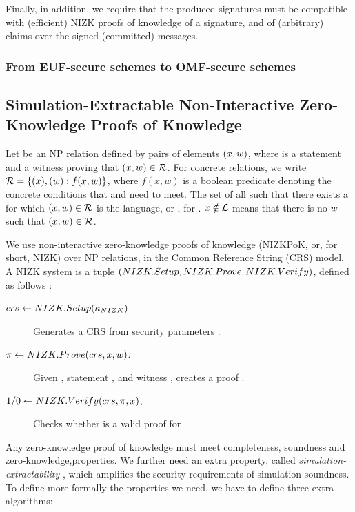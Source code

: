 Finally, in addition, we require that the produced signatures must be compatible
with (efficient) NIZK proofs of knowledge of a signature, and of (arbitrary)
claims over the signed (committed) messages.

\subsubsection{From EUF-secure \SBM schemes to OMF-secure \SBCM
  schemes} %

\subsection{Simulation-Extractable Non-Interactive Zero-Knowledge
  Proofs of Knowledge}
\label{sapp:nizk}

Let \NIZKRel be an NP relation defined by pairs of elements $(x,w)$,
where \NIZKx is a statement and \NIZKw a witness proving that $(x,w)
\in \mathcal{R}$. For concrete relations, we write $\mathcal{R} = \lbrace (x),
(w): f(x,w) \rbrace$, where $f(x,w)$ is a boolean predicate denoting the
concrete conditions that \NIZKx and \NIZKw need to meet. The set of all \NIZKx
such that there exists a \NIZKw for which $(x,w) \in \mathcal{R}$ is the
language, or \NIZKLang, for \NIZKRel. $x \notin \mathcal{L}$ means that
there is no $w$ such that $(x,w) \in \mathcal{R}$.

We use non-interactive zero-knowledge proofs of knowledge (NIZKPoK, or, for
short, NIZK) over NP relations, in the Common Reference String (CRS) model. A
NIZK system is a tuple $(NIZK.Setup,NIZK.Prove,NIZK.Verify)$, defined as follows
\cite{gos06}:

\begin{description}
\item[$crs \gets NIZK.Setup(\kappa_{NIZK})$.] Generates a CRS \NIZKcrs from
  security parameters \NIZKsecpar.
\item[$\pi \gets NIZK.Prove(crs,x,w)$.] Given \NIZKcrs,
  statement \NIZKx, and witness \NIZKw, creates a proof \NIZKproof.
\item[$1/0 \gets NIZK.Verify(crs,\pi,x)$.] Checks whether
  \NIZKproof is a valid proof for \NIZKx.
\end{description}

Any zero-knowledge proof of knowledge must meet completeness, soundness and
zero-knowledge,properties. We further need an extra property, called
\emph{simulation-extractability} \cite{cl06}, which amplifies the security
requirements of simulation soundness.
%
To define more formally the properties we need, we have to define three extra
algorithms:

